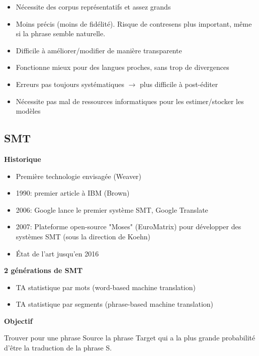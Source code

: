 \begin{itemize}
    \item Nécessite des corpus représentatifs et assez grands
    \item Moins précis (moins de fidélité). Risque de contresens plus important, même si la phrase semble naturelle.
    \item Difficile à améliorer/modifier de manière transparente
    \item Fonctionne mieux pour des langues proches, sans trop de divergences
    \item Erreurs pas toujours systématiques $\rightarrow$ plus difficile à post-éditer
    \item Nécessite pas mal de ressources informatiques pour les estimer/stocker les modèles\\
\end{itemize}

\subsection{SMT}

\textbf{Historique}

\begin{itemize}
    \item Première technologie envisagée (Weaver)
    \item 1990: premier article à IBM (Brown)
    \item 2006: Google lance le premier système SMT, Google Translate
    \item 2007: Plateforme open-source "Moses" (EuroMatrix) pour développer des systèmes SMT (sous la direction de Koehn)
    \item État de l'art jusqu'en 2016\\
\end{itemize}

\textbf{2 générations de SMT}

\begin{itemize}
    \item TA statistique par mots (word-based machine translation)
    \item TA statistique par segments (phrase-based machine translation)\\
\end{itemize}

\textbf{Objectif}

Trouver pour une phrase Source la phrase Target qui a la plus grande probabilité d'être la traduction de la phrase S.

